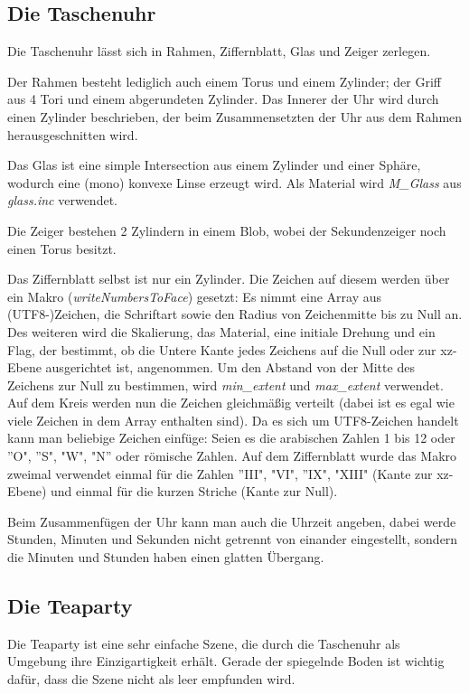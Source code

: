\documentclass[twocolumn]{article}
\begin{document}
\subsection{Die Taschenuhr}
Die Taschenuhr lässt sich in Rahmen, Ziffernblatt, Glas und Zeiger zerlegen.

Der Rahmen besteht lediglich auch einem Torus und einem Zylinder; der Griff aus 4 Tori und einem abgerundeten Zylinder.
Das Innerer der Uhr wird durch einen Zylinder beschrieben, der beim Zusammensetzten der Uhr aus dem Rahmen herausgeschnitten wird.

Das Glas ist eine simple Intersection aus einem Zylinder und einer Sphäre, wodurch eine (mono) konvexe Linse erzeugt wird.
Als Material wird  \textit{M\_Glass} aus \textit{glass.inc} verwendet.

Die Zeiger bestehen 2 Zylindern in einem Blob, wobei der Sekundenzeiger noch einen Torus besitzt.

Das Ziffernblatt selbst ist nur ein Zylinder. Die Zeichen auf diesem werden über ein Makro (\textit{writeNumbersToFace}) gesetzt:
Es nimmt eine Array aus (UTF8-)Zeichen, die Schriftart sowie den Radius von Zeichenmitte bis zu Null an. Des weiteren wird die Skalierung, das Material, eine initiale Drehung und ein Flag, der bestimmt, ob die Untere Kante jedes Zeichens auf die Null oder zur xz-Ebene ausgerichtet ist, angenommen. Um den Abstand von der Mitte des Zeichens zur Null zu bestimmen, wird \textit{min\_extent} und \textit{max\_extent} verwendet. Auf dem Kreis werden nun die Zeichen gleichmäßig verteilt (dabei ist es egal wie viele Zeichen in dem Array enthalten sind). Da es sich um UTF8-Zeichen handelt kann man beliebige Zeichen einfüge: Seien es die arabischen Zahlen 1 bis 12 oder  ''O", ''S", "W", "N'' oder römische Zahlen.
Auf dem Ziffernblatt wurde das Makro zweimal verwendet einmal für die Zahlen ''III", "VI", ''IX", "XIII" (Kante zur xz-Ebene) und einmal für die kurzen Striche (Kante zur Null).

Beim Zusammenfügen der Uhr kann man auch die Uhrzeit angeben, dabei werde Stunden, Minuten und Sekunden nicht getrennt von einander eingestellt, sondern die Minuten und Stunden haben einen glatten Übergang.

\subsection{Die Teaparty}
Die Teaparty ist eine sehr einfache Szene, die durch die Taschenuhr als Umgebung ihre Einzigartigkeit erhält.
Gerade der spiegelnde Boden ist wichtig dafür, dass die Szene nicht als leer empfunden wird.
\end{document}
